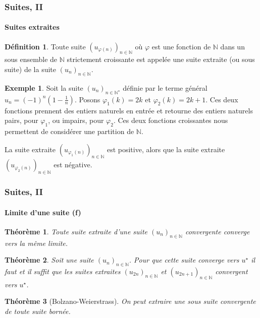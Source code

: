 \documentclass[10pt,notheorems]{beamer}
\theoremstyle{plain}
\newtheorem{theorem}{Théorème}
\theoremstyle{definition} %
\newtheorem{definition}{Définition}
\newtheorem{example}{Exemple}
\begin{document}
\begin{frame}
  \frametitle{Suites, II}
  \framesubtitle{Suites extraites}
  \hypertarget{slide_suites_extraites}{}

  \bigskip

  \begin{definition}
    Toute suite $(u_{\varphi(n)})_{n\in\mathbb N}$ où $\varphi$ est une fonction de $\mathbb N$ dans un sous ensemble de $\mathbb N$ strictement croissante est appelée une suite extraite (ou sous suite) de la suite $(u_n)_{n\in\mathbb N}$.
  \end{definition}

  \bigskip

  \begin{example}\label{ex:suite_extraite_divergente_0}
    Soit la suite $(u_n)_{n\in\mathbb N^{\star}}$ définie par le terme général $u_n = (-1)^n\left(1-\frac{1}{n}\right)$. Posons $\varphi_1(k) = 2k$ et $\varphi_2(k)=2k+1$. Ces deux fonctions prennent des entiers naturels en entrée et retourne des entiers naturels pairs, pour $\varphi_1$, ou impairs, pour $\varphi_2$. Ces deux fonctions croissantes nous permettent de considérer une partition de $\mathbb N$.\newline

    La suite extraite $(u_{\varphi_1(n)})_{n\in\mathbb N}$ est positive, alors que la suite extraite $(u_{\varphi_2(n)})_{n\in\mathbb N}$ est négative.
  \end{example}

\end{frame}


\begin{frame}
  \frametitle{Suites, II}
  \framesubtitle{Limite d'une suite (f)}
  \hypertarget{slide_suite_limite_6}{}

  \bigskip

  \begin{theorem}
    Toute suite extraite d'une suite $(u_n)_{n\in\mathbb N}$ convergente converge vers la même limite.
  \end{theorem}

  \bigskip

  \begin{theorem}
    Soit une suite $(u_n)_{n\in\mathbb N}$. Pour que  cette suite converge vers $u^{\star}$ il faut et il suffit que les suites extraites $(u_{2n})_{n\in\mathbb N}$ et $(u_{2n+1})_{n\in\mathbb N}$ convergent vers $u^{\star}$.
  \end{theorem}

  \bigskip

  \begin{theorem}[Bolzano-Weierstrass]
    On peut extraire une sous suite convergente de toute suite bornée.
  \end{theorem}

\end{frame}
\end{document}
